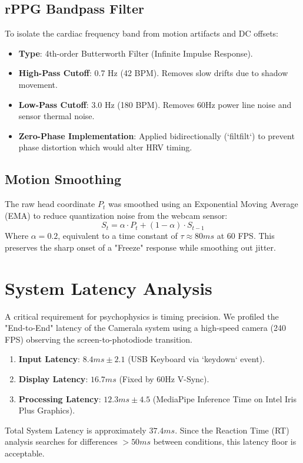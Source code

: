 \documentclass[journal]{IEEEtran}
\begin{document}
\subsection{rPPG Bandpass Filter}
To isolate the cardiac frequency band from motion artifacts and DC offsets:
\begin{itemize}
    \item \textbf{Type}: 4th-order Butterworth Filter (Infinite Impulse Response).
    \item \textbf{High-Pass Cutoff}: 0.7 Hz (42 BPM). Removes slow drifts due to shadow movement.
    \item \textbf{Low-Pass Cutoff}: 3.0 Hz (180 BPM). Removes 60Hz power line noise and sensor thermal noise.
    \item \textbf{Zero-Phase Implementation}: Applied bidirectionally (`filtfilt`) to prevent phase distortion which would alter HRV timing.
\end{itemize}

\subsection{Motion Smoothing}
The raw head coordinate $P_t$ was smoothed using an Exponential Moving Average (EMA) to reduce quantization noise from the webcam sensor:
\begin{equation}
    S_t = \alpha \cdot P_t + (1 - \alpha) \cdot S_{t-1}
\end{equation}
Where $\alpha = 0.2$, equivalent to a time constant of $\tau \approx 80ms$ at 60 FPS. 
This preserves the sharp onset of a "Freeze" response while smoothing out jitter.

\section{System Latency Analysis}
A critical requirement for psychophysics is timing precision. 
We profiled the "End-to-End" latency of the Camerala system using a high-speed camera (240 FPS) observing the screen-to-photodiode transition.

\begin{enumerate}
    \item \textbf{Input Latency}: $8.4ms \pm 2.1$ (USB Keyboard via `keydown` event).
    \item \textbf{Display Latency}: $16.7ms$ (Fixed by 60Hz V-Sync).
    \item \textbf{Processing Latency}: $12.3ms \pm 4.5$ (MediaPipe Inference Time on Intel Iris Plus Graphics).
\end{enumerate}
Total System Latency is approximately $37.4ms$. 
Since the Reaction Time (RT) analysis searches for differences $>50ms$ between conditions, this latency floor is acceptable.
\end{document}
